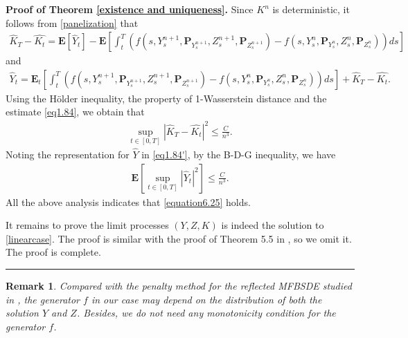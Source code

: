 \documentclass[10pt]{article}%
\numberwithin{equation}{section}
\newtheorem{remark}[theorem]{Remark}
\newenvironment{proof}[1][Proof]{\noindent \textbf{#1.} }{\  \rule{0.5em}{0.5em}}
\def \E{\mathbf{E}}
\def \P{\mathbf{P}}
\begin{document}
\begin{proof}[Proof of Theorem \ref{existence and uniqueness}]
Since $K^n$ is deterministic, it follows from \eqref{panelization} that
\begin{align*}
\hat{K}_T-\hat{K_t}=\E[\hat{Y}_t]-\E\left[\int_t^T \left(f\left(s,Y^{n+1}_s,\P_{Y^{n+1}_s},Z^{n+1}_s,\P_{Z^{n+1}_s}\right)-f\left(s,Y_s^n,\P_{Y^n_s},Z_s^n,\P_{Z^n_s}\right)\right)ds\right]
\end{align*}
and 
\begin{align}\label{eq1.84'}
\hat{Y}_t=\E_t\left[\int_t^T \left(f\left(s,Y^{n+1}_s,\P_{Y^{n+1}_s},Z^{n+1}_s,\P_{Z^{n+1}_s}\right)-f\left(s,Y_s^n,\P_{Y^n_s},Z_s^n,\P_{Z^n_s}\right)\right)ds\right]+\hat{K}_T-\hat{K_t}.
\end{align}
Using the H\"{o}lder inequality, the property of 1-Wasserstein distance and the estimate \eqref{eq1.84}, we obtain that%
\begin{align*}
\sup_{t\in[0,T]}|\hat{K}_T-\hat{K_t}|^2\leq \frac{C}{n^3}.
\end{align*}
Noting the representation for $\hat{Y}$ in \eqref{eq1.84'}, by the B-D-G inequality, we have
\begin{align*}
\E\left[\sup_{t\in[0,T]}|\hat{Y}_t|^2\right]\leq \frac{C}{n^3}.
\end{align*} 
All the above analysis indicates that \eqref{equation6.25} holds.

It remains to prove the limit processes $(Y,Z,K)$ is indeed the solution to \eqref{linearcase}. The proof is similar with the proof of Theorem 5.5 in \cite{L}, so we omit it. The proof is complete.
\end{proof}

\begin{remark}
Compared with the penalty method for the reflected MFBSDE studied in \cite{CHM,DEH}, the generator $f$ in our case may depend on the distribution of both the solution $Y$ and $Z$.  Besides, we do not need any monotonicity condition for the generator $f$. %
\end{remark}
\end{document}
